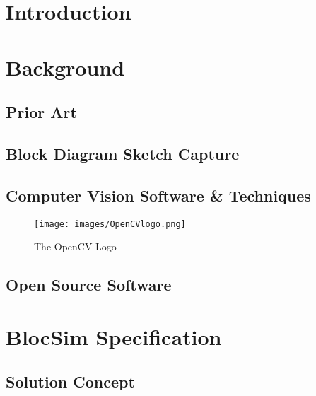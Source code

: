 \mainmatter


\chapter{Introduction}




\chapter{Background}



\section{Prior Art}



\section{Block Diagram Sketch Capture}



\section{Computer Vision Software \& Techniques}

\begin{figure}[ht!]
\centering
\texttt{[image: images/OpenCVlogo.png]}
\caption{The OpenCV Logo \cite{opencv2014}}
\label{im:cvlogo}
\end{figure}


\section{Open Source Software}




\chapter{BlocSim Specification}



\section{Solution Concept}

